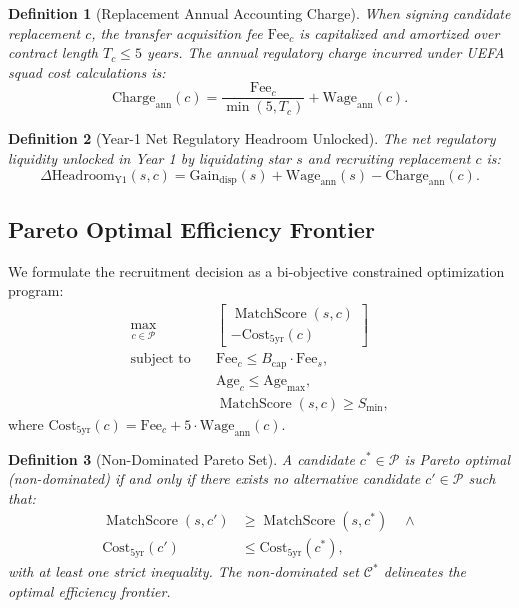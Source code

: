 \documentclass[10pt,journal,compsoc]{IEEEtran}
\newtheorem{definition}{Definition}
\begin{document}
\begin{definition}[Replacement Annual Accounting Charge]
When signing candidate replacement $c$, the transfer acquisition fee $\mathrm{Fee}_c$ is capitalized and amortized over contract length $T_c \le 5$ years. The annual regulatory charge incurred under UEFA squad cost calculations is:
\begin{equation}
\mathrm{Charge}_{\mathrm{ann}}(c) = \frac{\mathrm{Fee}_c}{\min(5, T_c)} + \mathrm{Wage}_{\mathrm{ann}}(c).
\end{equation}
\end{definition}

\begin{definition}[Year-1 Net Regulatory Headroom Unlocked]
The net regulatory liquidity unlocked in Year 1 by liquidating star $s$ and recruiting replacement $c$ is:
\begin{equation}
\Delta\mathrm{Headroom}_{\mathrm{Y1}}(s, c) = \mathrm{Gain}_{\mathrm{disp}}(s) + \mathrm{Wage}_{\mathrm{ann}}(s) - \mathrm{Charge}_{\mathrm{ann}}(c).
\end{equation}
\end{definition}

\subsection{Pareto Optimal Efficiency Frontier}
We formulate the recruitment decision as a bi-objective constrained optimization program:
\begin{equation}
\begin{aligned}
\max_{c \in \mathcal{P}} \quad & \begin{bmatrix} \operatorname{MatchScore}(s, c) \\ -\mathrm{Cost}_{5\mathrm{yr}}(c) \end{bmatrix} \\
\text{subject to} \quad & \mathrm{Fee}_c \le B_{\mathrm{cap}} \cdot \mathrm{Fee}_s, \\
& \mathrm{Age}_c \le \mathrm{Age}_{\max}, \\
& \operatorname{MatchScore}(s, c) \ge S_{\min},
\end{aligned}
\end{equation}
where $\mathrm{Cost}_{5\mathrm{yr}}(c) = \mathrm{Fee}_c + 5 \cdot \mathrm{Wage}_{\mathrm{ann}}(c)$.

\begin{definition}[Non-Dominated Pareto Set]
A candidate $c^* \in \mathcal{P}$ is Pareto optimal (non-dominated) if and only if there exists no alternative candidate $c' \in \mathcal{P}$ such that:
\begin{equation}
\begin{aligned}
\operatorname{MatchScore}(s, c') &\ge \operatorname{MatchScore}(s, c^*) \quad \land \\
\mathrm{Cost}_{5\mathrm{yr}}(c') &\le \mathrm{Cost}_{5\mathrm{yr}}(c^*),
\end{aligned}
\end{equation}
with at least one strict inequality. The non-dominated set $\mathcal{C}^*$ delineates the optimal efficiency frontier.
\end{definition}
\end{document}
